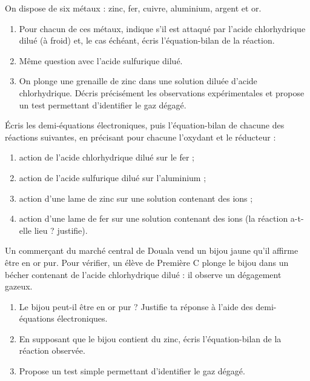 \documentclass[11pt]{article}
\newcounter{popsec}
\newcounter{popsub}
\newcommand{\courssub}[1]{%
  \stepcounter{popsub}%
  \par\vspace{9pt}\noindent{\popxbold\fontsize{11.5}{13}\selectfont\color{popink}{\color{poporange}\thepopsec.\thepopsub}\hspace{6pt}#1}\par\nopagebreak\vspace{4pt}
}
\begin{document}
\courssub{Je m'entraîne}

\begin{exercice}
On dispose de six métaux : zinc, fer, cuivre, aluminium, argent et or.
\begin{enumerate}
\item Pour chacun de ces métaux, indique s'il est attaqué par l'acide chlorhydrique dilué (à froid) et, le cas échéant, écris l'équation-bilan de la réaction.
\item Même question avec l'acide sulfurique dilué.
\item On plonge une grenaille de zinc dans une solution diluée d'acide chlorhydrique. Décris précisément les observations expérimentales et propose un test permettant d'identifier le gaz dégagé.
\end{enumerate}
\end{exercice}

\begin{exercice}
Écris les demi-équations électroniques, puis l'équation-bilan de chacune des réactions suivantes, en précisant pour chacune l'oxydant et le réducteur :
\begin{enumerate}
\item action de l'acide chlorhydrique dilué sur le fer ;
\item action de l'acide sulfurique dilué sur l'aluminium ;
\item action d'une lame de zinc sur une solution contenant des ions  ;
\item action d'une lame de fer sur une solution contenant des ions  (la réaction a-t-elle lieu ? justifie).
\end{enumerate}
\end{exercice}

\begin{exercice}
Un commerçant du marché central de Douala vend un bijou jaune qu'il affirme être en or pur. Pour vérifier, un élève de Première C plonge le bijou dans un bécher contenant de l'acide chlorhydrique dilué : il observe un dégagement gazeux.
\begin{enumerate}
\item Le bijou peut-il être en or pur ? Justifie ta réponse à l'aide des demi-équations électroniques.
\item En supposant que le bijou contient du zinc, écris l'équation-bilan de la réaction observée.
\item Propose un test simple permettant d'identifier le gaz dégagé.
\end{enumerate}
\end{exercice}
\end{document}
